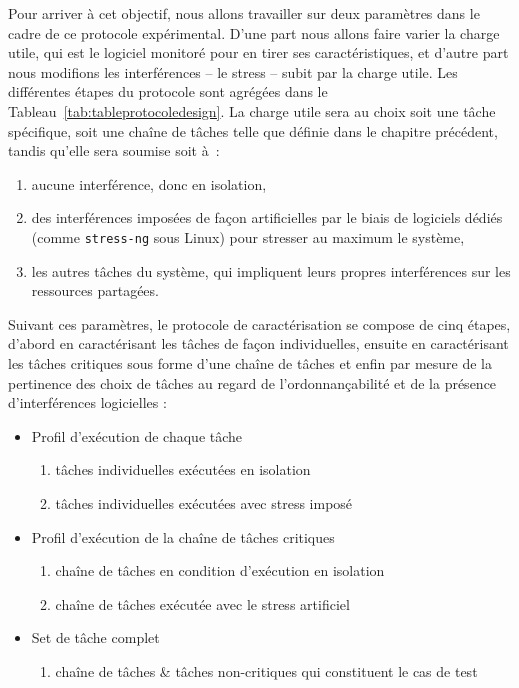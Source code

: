 \documentclass[french, a4paper, 11pt, twoside, pdftex]{StyleThese}
\begin{document}
        Pour arriver à cet objectif, nous allons travailler sur deux paramètres dans le cadre de ce protocole expérimental. D'une part nous allons faire varier la charge utile, qui est le logiciel monitoré pour en tirer ses caractéristiques, et d'autre part nous modifions les interférences -- le stress -- subit par la charge utile. Les différentes étapes du protocole sont agrégées dans le Tableau~\ref{tab:tableprotocoledesign}. La charge utile sera au choix soit une tâche spécifique, soit une chaîne de tâches telle que définie dans le chapitre précédent, tandis qu'elle sera soumise soit à~: \begin{enumerate}[label=\bfseries\alph*)] 
        	\item aucune interférence, donc en isolation,
        	\item des interférences imposées de façon artificielles par le biais de logiciels dédiés (comme \texttt{stress-ng} sous Linux) pour stresser au maximum le système,
        	\item les autres tâches du système, qui impliquent leurs propres interférences sur les ressources partagées.
        \end{enumerate}
        Suivant ces paramètres, le protocole de caractérisation se compose de cinq étapes, d'abord en caractérisant les tâches de façon individuelles, ensuite en caractérisant les tâches critiques sous forme d'une chaîne de tâches et enfin par mesure de la pertinence des choix de tâches au regard de l'ordonnançabilité et de la présence d'interférences logicielles : 
        \begin{itemize}
        	\item Profil d'exécution de chaque tâche
	        \begin{enumerate}[label=\large\ctxt{\arabic*}]
	        	\item tâches individuelles exécutées en isolation
	        	\item tâches individuelles exécutées avec stress imposé
	        \end{enumerate}
        	\item Profil d'exécution de la chaîne de tâches critiques
        	\begin{enumerate}[resume*]
        		\item chaîne de tâches en condition d'exécution en isolation
        		\item chaîne de tâches exécutée avec le stress artificiel
        	\end{enumerate}
        	\item Set de tâche complet
        	\begin{enumerate}[resume*]
        		\item chaîne de tâches \& tâches non-critiques qui constituent le cas de test 
        	\end{enumerate}
        \end{itemize}
    
\end{document}
